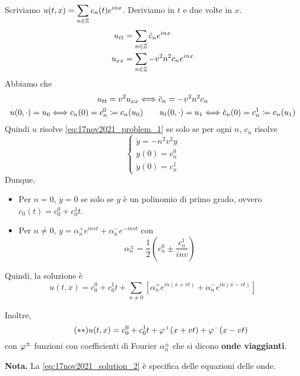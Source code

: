 Scriviamo $\displaystyle u(t,x) = \sum_{n \in \mathbb Z} c_n(t) e^{inx}$. Deriviamo in $t$ e due volte in $x$.
\begin{align*}
	u_{tt} & = \sum_{n \in \mathbb Z} \ddot c_n e^{inx} \\
	u_{xx} & = \sum_{n \in \mathbb Z} - v^2 n^2 c_n e^{inx}
\end{align*}
Abbiamo che
\begin{gather*}
	u_{tt} = v^2 u_{xx} \Longleftrightarrow \ddot c_n = -v^2 n^2 c_n \\
	u(0, \cdot) = u_0 \Longleftrightarrow c_n(0) = c_n^0 \coloneqq c_n(u_0)
	\qquad
	u_t(0, \cdot) = u_1 \Longleftrightarrow \dot c_n(0) = c_n^1 \coloneqq c_n(u_1)
\end{gather*}
Quindi $u$ risolve \eqref{eq:17nov2021_problem_1} se solo se per ogni $n$, $c_n$ risolve
%
\begin{equation}
\tag{P$'$} \label{eq:17nov2021_problem_2}
\begin{cases}
	\ddot y = -n^2 v^2 y \\
	y(0) = c_n^0 \\
	\dot y(0) = c_n^1
\end{cases} 
\end{equation}
%
Dunque,
\begin{itemize}

	\item Per $n = 0$, $\ddot y = 0$ se solo se $y$ è un polinomio di primo grado, ovvero $c_0(t) = c_0^0 + c_0^1 t$.


	\item Per $n \neq 0$, $y = \alpha_{n}^+ e^{invt} + \alpha_n^- e^{-invt} $ con 
	$$
		\alpha_n^{\pm} = \frac{1}{2} \left( c_n^0 \pm \frac{c_n^1}{inv} \right)
	$$                                 

\end{itemize}
%
Quindi, la soluzione è
\begin{equation}
 \tag{$\ast$} \label{eq:17nov2021_solution_1}
	u(t,x) = c_0^0 + c_0^1 t + \sum_{n\neq 0} \left[ \alpha_n^+ e^{in(x + vt)} + \alpha_n^- e^{in(x - vt)} \right]
\end{equation}

Inoltre,
\begin{equation}
\tag{$\ast \ast$} \label{eq:17nov2021_solution_2}
	u(t,x) = c_0^0 + c_0^1 t + \varphi^+(x + vt) + \varphi^-(x - vt)
\end{equation}
con $\varphi^{\pm}$ funzioni con coefficienti di Fourier $\alpha_n^{\pm}$ che si dicono \textbf{onde viaggianti}.

\textbf{Nota.} La \eqref{eq:17nov2021_solution_2} è specifica delle equazioni delle onde.
